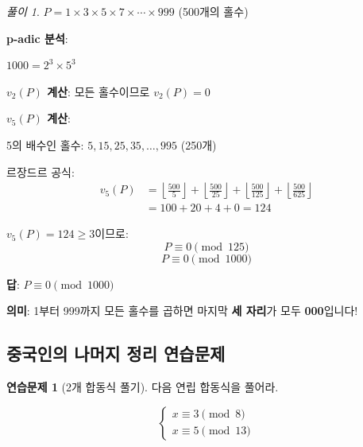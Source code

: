 \documentclass[11pt,a4paper]{article}
\theoremstyle{definition}
\newtheorem{exercise}{연습문제}[section]
\theoremstyle{remark}
\newtheorem*{solution}{풀이}
\begin{document}
\begin{solution}

$P = 1 \times 3 \times 5 \times 7 \times \cdots \times 999$ (500개의 홀수)

\textbf{p-adic 분석}:

$1000 = 2^3 \times 5^3$

\textbf{$v_2(P)$ 계산}:
모든 홀수이므로 $v_2(P) = 0$

\textbf{$v_5(P)$ 계산}:

5의 배수인 홀수: $5, 15, 25, 35, \ldots, 995$ (250개)

르장드르 공식:
\begin{align*}
v_5(P) &= \left\lfloor \frac{500}{5} \right\rfloor + \left\lfloor \frac{500}{25} \right\rfloor + \left\lfloor \frac{500}{125} \right\rfloor + \left\lfloor \frac{500}{625} \right\rfloor \\
&= 100 + 20 + 4 + 0 = 124
\end{align*}

$v_5(P) = 124 \geq 3$이므로:
\[P \equiv 0 \pmod{125}\]
\[P \equiv 0 \pmod{1000}\]

\textbf{답}: $P \equiv 0 \pmod{1000}$

\textbf{의미}: 1부터 999까지 모든 홀수를 곱하면 마지막 \textbf{세 자리}가 모두 \textbf{000}입니다!
\end{solution}

\subsection{중국인의 나머지 정리 연습문제}

\begin{exercise}[2개 합동식 풀기]
다음 연립 합동식을 풀어라.

\[\begin{cases}
x \equiv 3 \pmod{8} \\
x \equiv 5 \pmod{13}
\end{cases}\]
\end{exercise}
\end{document}
